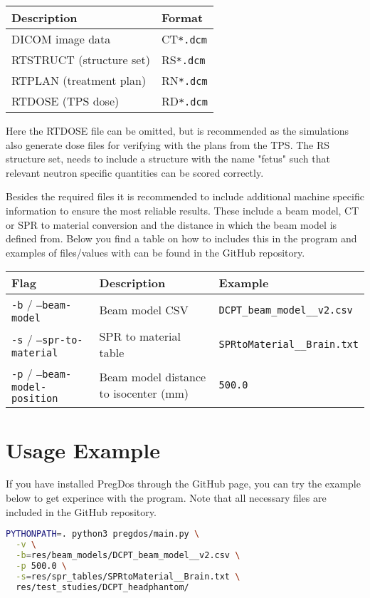 \documentclass[11pt]{article}
\begin{document}
\begin{longtable}{|l|l|}
\hline
\textbf{Description} & \textbf{Format} \\
\hline
DICOM image data & CT\texttt{*.dcm} \\
RTSTRUCT (structure set) & RS\texttt{*.dcm} \\
RTPLAN (treatment plan) & RN\texttt{*.dcm} \\
RTDOSE (TPS dose) & RD\texttt{*.dcm} \\
\hline
\end{longtable}

Here the RTDOSE file can be omitted, but is recommended as the simulations also generate dose files for verifying with the plans from the TPS. The RS structure set, needs to include a structure with the name "fetus" such that relevant neutron specific quantities can be scored correctly. 

Besides the required files it is recommended to include additional machine specific information to ensure the most reliable results. These include a beam model, CT or SPR to material conversion and the distance in which the beam model is defined from. Below you find a table on how to includes this in the program and examples of files/values with can be found in the GitHub repository. 

\begin{longtable}{|l|l|l|}
\hline
\textbf{Flag} & \textbf{Description} & \textbf{Example} \\
\hline
\texttt{-b} / \texttt{--beam-model} & Beam model CSV & \texttt{DCPT\_beam\_model\_\_v2.csv} \\
\texttt{-s} / \texttt{--spr-to-material} & SPR to material table & \texttt{SPRtoMaterial\_\_Brain.txt} \\
\texttt{-p} / \texttt{--beam-model-position} & Beam model distance to isocenter (mm) & \texttt{500.0} \\
\hline
\end{longtable}

\section{Usage Example}

If you have installed PregDos through the GitHub page, you can try the example below to get experince with the program. Note that all necessary files are included in the GitHub repository.

\begin{lstlisting}[language=bash]
PYTHONPATH=. python3 pregdos/main.py \
  -v \
  -b=res/beam_models/DCPT_beam_model__v2.csv \
  -p 500.0 \
  -s=res/spr_tables/SPRtoMaterial__Brain.txt \
  res/test_studies/DCPT_headphantom/
\end{lstlisting}
\end{document}
